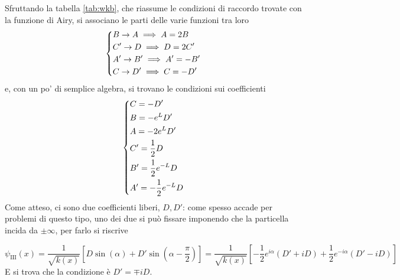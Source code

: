 Sfruttando la tabella \ref{tab:wkb}, che riassume le condizioni di raccordo trovate con la funzione di
Airy, si associano le parti delle varie funzioni tra loro
$$\begin{dcases}
    B\to A\implies A=2B \\
    C'\to D\implies D=2C'\\
    A'\to B'\implies A'=-B'\\
    C\to D'\implies C=-D'\\
\end{dcases}$$
e, con un po' di semplice algebra, si trovano le condizioni sui coefficienti
$$\begin{dcases}
C=-D'\\
B=-e^LD'\\
A=-2e^LD'\\
C'=\frac12 D\\
B'=\frac{1}{2}e^{-L}D\\
A'=-\frac{1}{2}e^{-L}D
\end{dcases}$$
Come atteso, ci sono due coefficienti liberi, $D,D'$: come spesso accade per problemi di questo tipo,
uno dei due si può fissare imponendo che la particella incida da $\pm\infty$, per farlo si riscrive

$$\psi_\text{III}(x)=\frac{1}{\sqrt{k(x)}}\left[D\sin(\alpha)+D'\sin\left(\alpha-\frac{\pi}{2}\right)
\right]=\frac{1}{\sqrt{k(x)}}\left[-\frac{1}{2}e^{i\alpha}(D'+iD)+\frac12 e^{-i\alpha}(D'-iD)\right]$$
E si trova che la condizione è $D'=\mp iD$.

